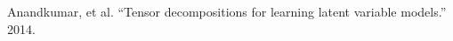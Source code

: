 \documentclass[preview]{standalone}
\begin{document}
\begin{center}
Anandkumar, et al. ``Tensor decompositions for learning latent variable models.'' 2014.
\end{center}
\end{document}
